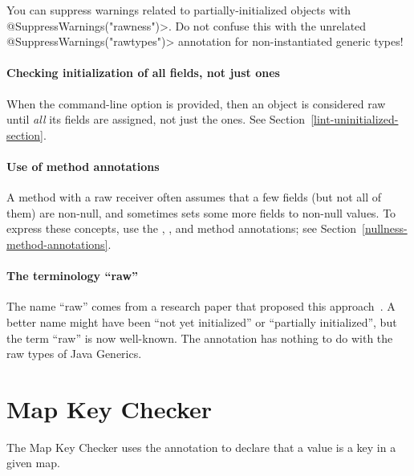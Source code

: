 \begin{sloppypar}
You can suppress warnings related to partially-initialized objects with
\<@SuppressWarnings("rawness")>.  Do not confuse this with the unrelated
\<@SuppressWarnings("rawtypes")> annotation for non-instantiated generic types!
\end{sloppypar}


\paragraph{Checking initialization of all fields, not just  ones}

When the  command-line option is provided, then
an object is considered raw until \emph{all} its fields are assigned, not
just the  ones.  See Section~\ref{lint-uninitialized-section}.


\paragraph{Use of method annotations}

A method with a raw receiver often assumes that a few fields (but not all
of them) are non-null, and sometimes sets some more fields to non-null
values.  To express these concepts, use the
,
, and
 method annotations;
see Section~\ref{nullness-method-annotations}.


\paragraph{The terminology ``raw''}

The name ``raw'' comes from a research paper that proposed this
approach~\cite{FahndrichL2003}.
A better name might have been ``not yet initialized'' or ``partially
initialized'', but the term ``raw'' is now well-known.
The 
annotation has nothing to do with the raw types of Java Generics.


\section{Map Key Checker\label{map-key-checker}}

The Map Key Checker uses the 
annotation to declare that a value is a key in a given map.

